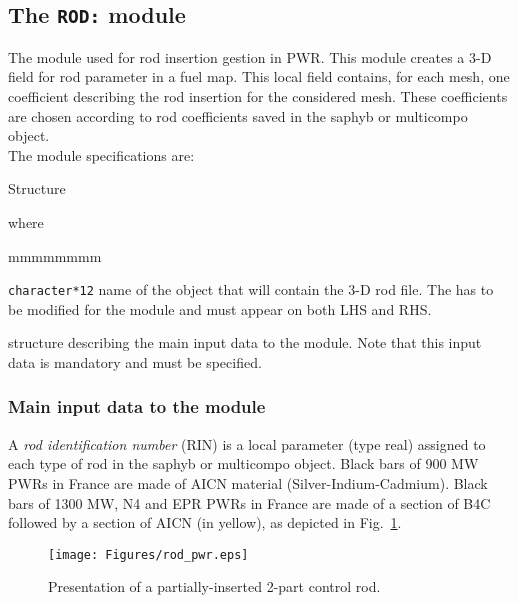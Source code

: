 \subsection{The {\tt ROD:} module}\label{sect:RODData}

The  module used for rod insertion gestion in PWR. This module creates a 3-D field for rod parameter in a fuel map. This local field contains, for each mesh, one coefficient describing the rod insertion for the considered mesh. These coefficients are chosen according to rod coefficients saved in the {\sc saphyb} or {\sc multicompo} object.\\

The  module specifications are:

\begin{DataStructure}{Structure }
 \moc{:=}   \moc{::} 
\end{DataStructure}

\noindent where
\begin{ListeDeDescription}{mmmmmmmm}

\item[\dusa{FLMAP}] \texttt{character*12} name of the  object that will contain the 3-D rod file. The  has to be modified for the module and must appear on both LHS and RHS.

\item[\dstr{descrod1}] structure describing the main input data to the  module. Note that this input data is mandatory and must be specified.

\end{ListeDeDescription}

\subsubsection{Main input data to the  module}\label{sect:rodmain}

A {\sl rod identification number} (RIN) is a local parameter (type real) assigned to each type of rod in the {\sc saphyb} or
{\sc multicompo} object. Black bars of 900 MW PWRs in France are made of AICN material (Silver-Indium-Cadmium). Black bars of 1300 MW, N4 and EPR  PWRs in France are made of a section of B4C followed by a section of AICN (in yellow), as depicted in Fig.~\ref{fig:rod_pwr}. 

\begin{figure}[h!]
  \begin{center}
    \texttt{[image: Figures/rod\_pwr.eps]} 
\caption{Presentation of a partially-inserted 2-part control rod.}\label{fig:rod_pwr}
  \end{center}
\end{figure}

